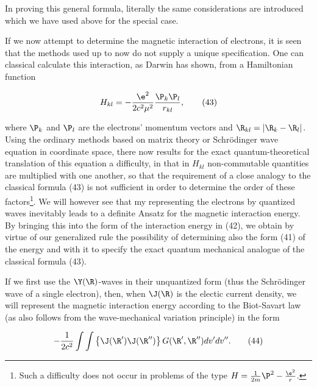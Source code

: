 \documentclass{article}
\newcommand{\nequ}[2]{
\begin{align*}
#1
\tag{#2}
\end{align*}
}
\begin{document}
In proving this general formula, literally the same considerations are introduced which we have used above for the special case.

If we now attempt to determine the magnetic interaction of electrons, it is seen that the methods used up to now do not supply a unique specification. One can classical calculate this interaction, as  Darwin has shown, from a Hamiltonian function
\nequ{
H_{kl} = -\frac{\e^2}{2 c^2 \mu^2}\frac{\P_k\P_l}{r_{kl}},
}{43}
where $\P_k$ and $\P_l$ are the electrons' momentum vectors and $\R_{kl} = |\R_k - \R_l|$. Using the ordinary methods based on matrix theory or Schrödinger wave equation in coordinate space, there now results for the exact quantum-theoretical translation of this equation a difficulty, in that in $H_{kl}$ non-commutable quantities are multiplied with one another, so that the requirement of a close analogy to the classical formula (43) is not sufficient in order to determine the order of these factors\footnote{Such a difficulty does not occur in problems of the type $H=\frac{1}{2m}\P^2 - \frac{\e^2}{r}$.}. We will however see that my representing the electrons by quantized waves inevitably leads to a definite Ansatz for the magnetic interaction energy. By bringing this into the form of the interaction energy in (42), we obtain by virtue of our generalized rule the possibility of determining also the form (41) of the energy and with it to specify the exact quantum mechanical analogue of the classical formula (43).

If we first use the $\Y(\R)$-waves in their unquantized form (thus the Schrödinger wave of a single electron), then, when $\J(\R)$ is the electic current density, we will represent the magnetic interaction energy according to the Biot-Savart law (as also follows from the wave-mechanical variation principle) in the form
\nequ{
-\frac{1}{2c^2}\int\int\left\{\J(\R')\J(\R'')\right\}G(\R',\R'')dv' dv''.
}{44}
\end{document}
